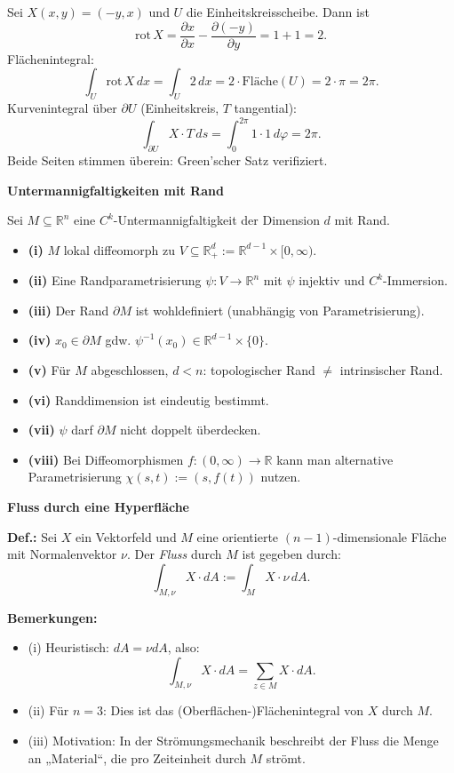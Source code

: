Sei $X(x,y) = (-y, x)$ und $U$ die Einheitskreisscheibe. Dann ist
\[
\mathrm{rot}\, X = \frac{\partial x}{\partial x} - \frac{\partial (-y)}{\partial y} = 1 + 1 = 2.
\]
Flächenintegral:
\[
\int_U \mathrm{rot}\, X \, dx = \int_U 2 \, dx = 2 \cdot \text{Fläche}(U) = 2 \cdot \pi = 2\pi.
\]
Kurvenintegral über $\partial U$ (Einheitskreis, $T$ tangential):
\[
\int_{\partial U} X \cdot T \, ds = \int_0^{2\pi} 1 \cdot 1 \, d\varphi = 2\pi.
\]
Beide Seiten stimmen überein: Green'scher Satz verifiziert.

\textbf{Untermannigfaltigkeiten mit Rand}

Sei $M \subseteq \mathbb{R}^n$ eine $C^k$-Untermannigfaltigkeit der Dimension $d$ mit Rand.

\begin{itemize}
  \item \textbf{(i)} $M$ lokal diffeomorph zu $V \subseteq \mathbb{R}_+^d := \mathbb{R}^{d-1} \times [0,\infty)$.
  \item \textbf{(ii)} Eine Randparametrisierung $\psi: V \to \mathbb{R}^n$ mit $\psi$ injektiv und $C^k$-Immersion.
  \item \textbf{(iii)} Der Rand $\partial M$ ist wohldefiniert (unabhängig von Parametrisierung).
  \item \textbf{(iv)} $x_0 \in \partial M$ gdw. $\psi^{-1}(x_0) \in \mathbb{R}^{d-1} \times \{0\}$.
  \item \textbf{(v)} Für $M$ abgeschlossen, $d < n$: topologischer Rand $\ne$ intrinsischer Rand.
  \item \textbf{(vi)} Randdimension ist eindeutig bestimmt.
  \item \textbf{(vii)} $\psi$ darf $\partial M$ nicht doppelt überdecken.
  \item \textbf{(viii)} Bei Diffeomorphismen $f: (0,\infty) \to \mathbb{R}$ kann man alternative Parametrisierung $\chi(s,t) := (s, f(t))$ nutzen.
\end{itemize}

\textbf{Fluss durch eine Hyperfläche}

\textbf{Def.:} Sei $X$ ein Vektorfeld und $M$ eine orientierte $(n{-}1)$-dimensionale Fläche mit Normalenvektor $\nu$. Der \emph{Fluss} durch $M$ ist gegeben durch:
\[
\int_{M,\nu} X \cdot dA := \int_M X \cdot \nu \, dA.
\]

\textbf{Bemerkungen:}
\begin{itemize}
  \item (i) Heuristisch: $dA = \nu dA$, also:
  \[
  \int_{M,\nu} X \cdot dA = \sum_{z \in M} X \cdot dA.
  \]
  \item (ii) Für $n = 3$: Dies ist das (Oberflächen-)Flächenintegral von $X$ durch $M$.
  \item (iii) Motivation: In der Strömungsmechanik beschreibt der Fluss die Menge an „Material“, die pro Zeiteinheit durch $M$ strömt.
\end{itemize}

